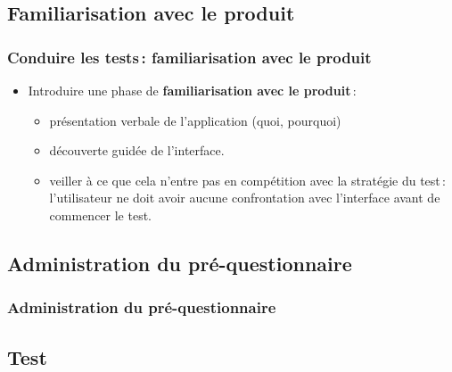 		\subsection{Familiarisation avec le produit} 
		
		\begin{frame}[allowframebreaks]
		\frametitle{Conduire les tests\,: familiarisation avec le produit \citep{ergolab2014a}}
					\begin {itemize}
				      \item Introduire une phase de \textbf{familiarisation avec le produit}\,:  
				      		\begin {itemize}
						\item présentation verbale de l'application (quoi, pourquoi) 
						\item découverte guidée de l'interface.
						\item veiller à ce que cela n'entre pas en compétition avec la stratégie du test\,: l'utilisateur ne doit avoir aucune confrontation avec l'interface avant de commencer le test. 
						\end{itemize}
					\end{itemize}
		\end{frame}   	
		
		\subsection{Administration du pré-questionnaire} 
		\begin{frame}
		\frametitle{Administration du pré-questionnaire}
					
		\end{frame}  
		
		 \subsection{Test} 
		
